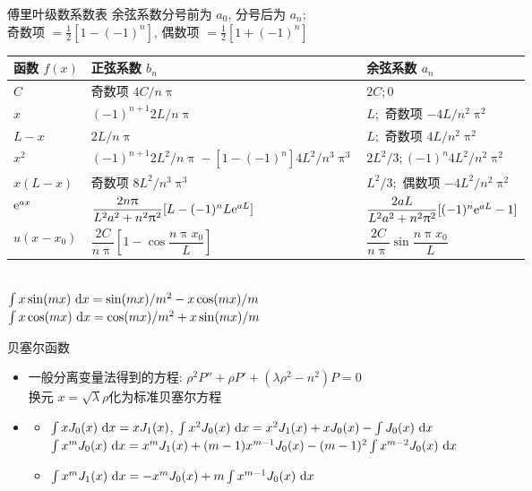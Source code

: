 \documentclass[landscape,a4paper]{ctexart}
\begin{document}
	\begin{cheatsheetcolumns}[3]
		\begin{card}{傅里叶级数系数表}
			余弦系数分号前为 $a_0$, 分号后为 $a_n$;\\
			奇数项 $=\frac{1}{2}[1-(-1)^n]$, 偶数项 $=\frac{1}{2}[1+(-1)^n]$\\
			\begin{tabular}{l|l|l}
				函数 $f(x)$ & 正弦系数 $b_n$            & 余弦系数 $a_n$                               \\ \hline
				$C$       & 奇数项 $4C/n\uppi$       & $2C; 0$                         \\
				$x$       & $(-1)^{n+1}2L/n\uppi$ & $L;$ 奇数项 $-4L/n^2\uppi^2$       \\
				$L-x$     & $2L/n\uppi$           & $L;$ 奇数项 $4L/n^2\uppi^2$        \\
				$x^2$      & $(-1)^{n+1}2L^2/n\uppi-[1-(-1)^n]4L^2/n^3\uppi^3$            & $2L^2/3;(-1)^n4L^2/n^2\uppi^2$          \\
				$x(L-x)$  & 奇数项 $8L^2/n^3\uppi^3$ & $L^2/3;$ 偶数项 $-4L^2/n^2\uppi^2$ \\
				$\mathrm{e}^{ax}$  & $\dfrac{2n\uppi}{L^2a^2+n^2\uppi^2}[L-(-1)^nL\mathrm{e}^{aL}]$       & $\dfrac{2aL}{L^2a^2+n^2\uppi^2}[(-1)^n\mathrm{e}^{aL}-1]$ \\
				$u(x-x_0)$ & $\dfrac{2C}{n\uppi}\left[1-\cos\dfrac{n\uppi x_0}{L}\right]$ & $\dfrac{2C}{n\uppi}\sin\dfrac{n\uppi x_0}{L}$   
			\end{tabular}%
			\\
			$\int x\sin(mx)\,\odif{x}=\sin(mx)/m^2-x\cos(mx)/m$\\
			$\int x\cos(mx)\,\odif{x}=\cos(mx)/m^2+x\sin(mx)/m$
		\end{card}
		\begin{card}{贝塞尔函数}
			\begin{itemize}
				\item 一般分离变量法得到的方程: $\rho^2P''+\rho P'+\left(\lambda\rho^2-n^2\right)P=0$\\
				换元 $x=\sqrt{\lambda}\rho$化为标准贝塞尔方程
			\item \begin{itemize}
			\item $\int xJ_0(x)\,\odif{x}=xJ_1(x)$, $\int x^2J_0(x)\,\odif{x}=x^2J_1(x)+xJ_0(x)-\int J_0(x)\,\odif{x}$\\$\int x^mJ_0(x)\,\odif{x}=x^mJ_1(x)+(m-1)x^{m-1}J_0(x)-(m-1)^2\int x^{m-2}J_0(x)\,\odif{x}$
			\item $\int x^mJ_1(x)\,\odif{x}=-x^mJ_0(x)+m\int x^{m-1}J_0(x)\,\odif{x}$

\end{itemize}
\end{itemize}
\end{card}
\end{cheatsheetcolumns}
\end{document}
